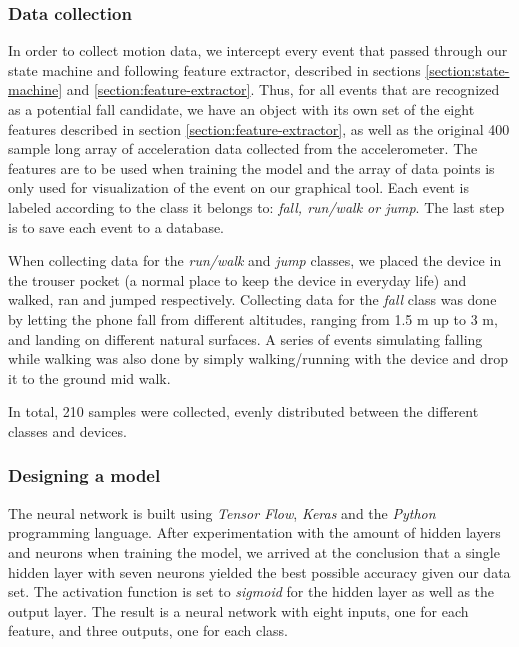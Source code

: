 \documentclass[12pt, a4paper, onecolumn]{article}
\begin{document}
	\subsubsection{Data collection}
	In order to collect motion data, we intercept every event that passed through our state machine and following feature extractor, described in sections \ref{section:state-machine} and \ref{section:feature-extractor}. Thus, for all events that are recognized as a potential fall candidate, we have an object with its own set of the eight features described in section \ref{section:feature-extractor}, as well as the original 400 sample long array of acceleration data collected from the accelerometer. The features are to be used when training the model and the array of data points is only used for visualization of the event on our graphical tool. Each event is labeled according to the class it belongs to: \textit{fall, run/walk or jump}. The last step is to save each event to a database. 
	
	When collecting data for the \textit{run/walk} and \textit{jump} classes, we placed the device in the trouser pocket (a normal place to keep the device in everyday life) and walked, ran and jumped respectively. Collecting data for the \textit{fall} class was done by letting the phone fall from different altitudes, ranging from 1.5 m up to 3 m, and landing on different natural surfaces. A series of events simulating falling while walking was also done by simply walking/running with the device and drop it to the ground mid walk.
	
	In total, 210 samples were collected, evenly distributed between the different classes and devices.
	
	\subsubsection{Designing a model}
	The neural network is built using \textit{Tensor Flow}, \textit{Keras} and the \textit{Python} programming language. After experimentation with the amount of hidden layers and neurons when training the model, we arrived at the conclusion that a single hidden layer with seven neurons yielded the best possible accuracy given our data set. The activation function is set to \textit{sigmoid} for the hidden layer as well as the output layer. The result is a neural network with eight inputs, one for each feature, and three outputs, one for each class. 
	
\end{document}
